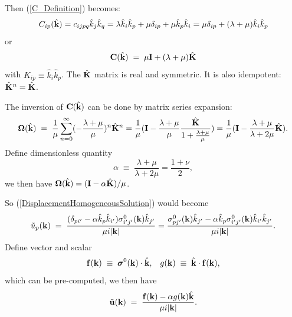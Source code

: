 \documentclass[12pt]{article}
\def\bmath#1{\mbox{\boldmath$#1$}}
\begin{document}
Then (\ref{C_Definition}) becomes:
\begin{equation}
 C_{ip}(\hat{\bf k}) = c_{ijpq} \hat{k}_j\hat{k}_q = 
\lambda \hat{k}_i \hat{k}_p + \mu \delta_{ip} + \mu \hat{k}_p\hat{k}_i  =
 \mu \delta_{ip} + (\lambda+\mu) \hat{k}_i \hat{k}_p
\end{equation}
or
\begin{equation}
 {\bf C}(\hat{\bf k}) \;=\; \mu{\bf I}+(\lambda+\mu) \hat{\bf K}
\end{equation}
with $K_{ip}\equiv \hat{k}_i \hat{k}_p$.  The $\hat{\bf K}$ matrix is
real and symmetric.  It is also idempotent: $\hat{\bf K}^n=\hat{\bf
K}$.

The inversion of ${\bf C}(\hat{\bf k})$ can be done by matrix series expansion:
\begin{equation}
 {\bf \Omega}(\hat{\bf k}) \;=\; 
\frac{1}{\mu}\sum_{n=0}^\infty (-\frac{\lambda+\mu}{\mu})^n \hat{\bf K}^n 
= \frac{1}{\mu} ( {\bf I} - \frac{\lambda+\mu}{\mu} \frac{\hat{\bf K}}{1+\frac{\lambda+\mu}{\mu}} ) 
= \frac{1}{\mu} ( {\bf I} - \frac{\lambda+\mu}{\lambda+2\mu}\hat{\bf K} ).
\end{equation}
Define dimensionless quantity
\begin{equation}
 \alpha \;\equiv\; \frac{\lambda+\mu}{\lambda+2\mu} = \frac{1+\nu}{2},
\end{equation}
we then have ${\bf \Omega}(\hat{\bf k}) = ({\bf I} - \alpha\hat{\bf K})/\mu$.

So (\ref{DisplacementHomogeneousSolution}) would become
\begin{equation}
 \tilde{u}_p({\bf k}) \;=\; 
 \frac{(\delta_{pi'}-\alpha\hat{k}_p\hat{k}_{i'})\sigma^0_{i'j'}({\bf k}) \hat{k}_{j'}}
 {\mu i|{\bf k}|} = \frac{\sigma^0_{pj'}({\bf k}) \hat{k}_{j'} - 
 \alpha\hat{k}_p\sigma^0_{i'j'}({\bf k})\hat{k}_{i'}\hat{k}_{j'}}
 {\mu i|{\bf k}|}.
\end{equation}
Define vector and scalar 
\begin{equation}
 {\bf f}({\bf k}) \;\equiv\; \bmath{\sigma}^0({\bf k})\cdot \hat{\bf k}, \;\;\;
 g({\bf k}) \;\equiv\; \hat{\bf k}\cdot {\bf f}({\bf k}),
\end{equation}
which can be pre-computed, we then have
\begin{equation}
 \tilde{\bf u}({\bf k}) \;=\; 
 \frac{{\bf f}({\bf k}) - \alpha g({\bf k})\hat{\bf k}}{\mu i|{\bf k}|}.
 \label{DisplacementHomogeneousIsotropicSolution2D}
\end{equation}
\end{document}
